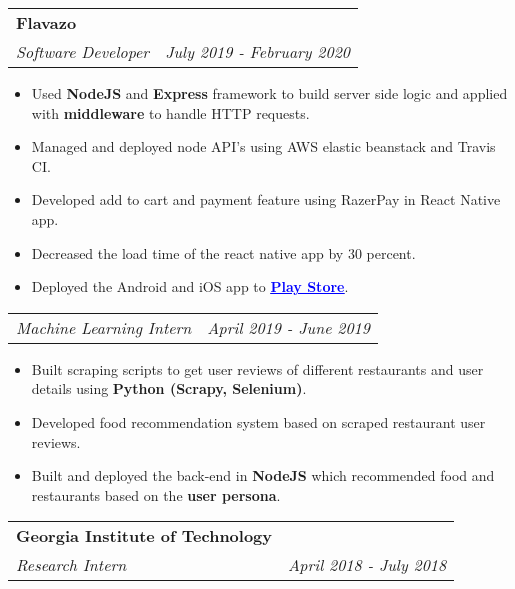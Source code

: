 \documentclass[a4paper,6pt]{article}
\begin{document}
\vspace{4px}
\begin{tabularx}{\textwidth}{X r}
	\large{\textbf{Flavazo}} \vspace{4px} & \\
	\textit{\small Software Developer} & \textit{July 2019 - February 2020} \\
\end{tabularx}

\small
\begin{itemize}
	\itemsep0em
	\item Used \textcolor{mygray}{\textbf{NodeJS}} and \textcolor{mygray}{\textbf{Express}} framework to build server side logic and applied with \textcolor{mygray}{\textbf{middleware}} to handle HTTP requests.
	\item Managed and deployed node API’s using AWS elastic beanstack and Travis CI.
    \item Developed add to cart and payment feature using RazerPay in React Native app.
    \item Decreased the load time of the react native app by 30 percent.
    \item Deployed the Android and iOS app to \href{https://play.google.com/store/apps/details?id=com.flavazo.user}{\textcolor{blue}{\textbf{\underline{Play Store}}}}.
\end{itemize}

\normalsize
\vspace{2px}
\begin{tabularx}{\textwidth}{X r}
	\textit{\small Machine Learning Intern}& \textit{April 2019 - June 2019} \\
\end{tabularx}

\small
\begin{itemize}
	\itemsep0em
	\item Built scraping scripts to get user reviews of different restaurants and user details using \textcolor{mygray}{\textbf{Python (Scrapy, Selenium)}}.
    \item Developed food recommendation system based on scraped restaurant user reviews.
    \item Built and deployed the back-end in \textcolor{mygray}{\textbf{NodeJS}} which recommended food and restaurants based on the \textcolor{mygray}{\textbf{user persona}}.
\end{itemize}


\vspace{6px}
\begin{tabularx}{\textwidth}{X r}
	\large{\textbf{Georgia Institute of Technology}} \vspace{2px} & \\
	\textit{\small Research Intern}& \textit{April 2018 - July 2018} \\
\end{tabularx}
\end{document}
